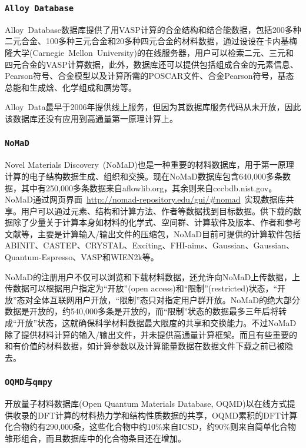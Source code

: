 \subsubsection{\tt{Alloy Database}}
\textrm{Alloy~Database}数据库提供了用\textrm{VASP}计算的合金结构和结合能数据\cite{AlloyD_URL}，包括200多种二元合金、100多种三元合金和20多种四元合金的材料数据，通过设设在卡内基梅隆大学\textrm{(Carnegie~Mellon~University)}的在线服务器，用户可以检索二元、三元和四元合金的\textrm{VASP}计算数据，此外，数据库还可以提供包括组成合金的元素信息、\textrm{Pearson}符号、合金模型以及计算所需的\textrm{POSCAR}文件、合金\textrm{Pearson}符号，基态总能和生成焓、化学组成和赝势等。

\textrm{Alloy~Data}最早于2006年提供线上服务，但因为其数据库服务代码从未开放，因此该数据库还没有应用到高通量第一原理计算上。

\subsubsection{\tt{NoMaD}}
\textrm{Novel Materials Discovery~(NoMaD)}也是一种重要的材料数据库，用于第一原理计算的电子结构数据生成、组织和交换\cite{NoMaD_URL}。现在\textrm{NoMaD}数据库包含640,000多条数据，其中有250,000多条数据来自\textrm{aflowlib.org}，其余则来自\textrm{cccbdb.nist.gov}。\textrm{NoMaD}通过网页界面~\textrm{\url{http://nomad-repository.edu/gui/\#nomad}}~实现数据库共享。用户可以通过元素、结构和计算方法、作者等数据找到目标数据。供下载的数据除了少量关于计算本身如材料的化学式、空间群、计算软件及版本、作者和参考文献等，主要是计算输入/输出文件的压缩包，\textrm{NoMaD}目前可提供的计算软件包括\textrm{ABINIT}、\textrm{CASTEP}、\textrm{CRYSTAL}、\textrm{Exciting}、\textrm{FHI-aims}、\textrm{Gaussian}、\textrm{Gaussian}、\textrm{Quantum-Espresso}、\textrm{VASP}和\textrm{WIEN2k}等。

\textrm{NoMaD}的注册用户不仅可以浏览和下载材料数据，还允许向\textrm{NoMaD}上传数据，上传数据可以根据用户指定为“开放”\textrm{(open access)}和“限制”\textrm{(restricted)}状态，“开放”态对全体互联网用户开放，“限制”态只对指定用户群开放。\textrm{NoMaD}的绝大部分数据是开放的，约540,000多条是开放的，而“限制”状态的数据最多三年后将转成“开放”状态，这就确保科学材料数据最大限度的共享和交换能力。不过\textrm{NoMaD}除了提供材料计算的输入/输出文件，并未提供高通量计算框架。而且有些重要的和有价值的材料数据，如计算参数以及计算能量数据在数据文件下载之前已被隐去。

\subsubsection{\tt{OQMD}与\tt{qmpy}}
开放量子材料数据库\textrm{(Open Quantum Materials Database, OQMD)}以在线方式提供收录的\textrm{DFT}计算的材料热力学和结构性质数据的共享\cite{OQMD_URL,NCM1-15010_2015}，\textrm{OQMD}累积的\textrm{DFT}计算化合物约有290,000条，这些化合物中约10\%来自\textrm{ICSD}，约90\%则来自简单化合物雏形组合，而且数据库中的化合物条目还在增加。

